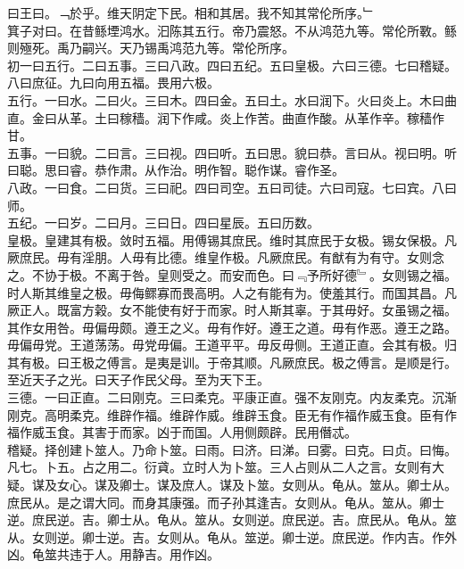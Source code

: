 \documentclass{zhvt-classic}
\begin{document}
\hspace*{2em}曰王曰。﹁於乎。维天阴定下民。相和其居。我不知其常伦所序。﹂\\
\hspace*{2em}箕子对曰。在昔鲧堙鸿水。汩陈其五行。帝乃震怒。不从鸿范九等。常伦所斁。鲧则殛死。禹乃嗣兴。天乃锡禹鸿范九等。常伦所序。\\
\hspace*{2em}初一曰五行。二曰五事。三曰八政。四曰五纪。五曰皇极。六曰三德。七曰稽疑。八曰庶征。九曰向用五福。畏用六极。\\
\hspace*{2em}五行。一曰水。二曰火。三曰木。四曰金。五曰土。水曰润下。火曰炎上。木曰曲直。金曰从革。土曰稼穑。润下作咸。炎上作苦。曲直作酸。从革作辛。稼穑作甘。\\
\hspace*{2em}五事。一曰貌。二曰言。三曰视。四曰听。五曰思。貌曰恭。言曰从。视曰明。听曰聪。思曰睿。恭作肃。从作治。明作智。聪作谋。睿作圣。\\
\hspace*{2em}八政。一曰食。二曰货。三曰祀。四曰司空。五曰司徒。六曰司寇。七曰宾。八曰师。\\
\hspace*{2em}五纪。一曰岁。二曰月。三曰日。四曰星辰。五曰历数。\\
\hspace*{2em}皇极。皇建其有极。敛时五福。用傅锡其庶民。维时其庶民于女极。锡女保极。凡厥庶民。毋有淫朋。人毋有比德。维皇作极。凡厥庶民。有猷有为有守。女则念之。不协于极。不离于咎。皇则受之。而安而色。曰﹃予所好德﹄。女则锡之福。时人斯其维皇之极。毋侮鳏寡而畏高明。人之有能有为。使羞其行。而国其昌。凡厥正人。既富方榖。女不能使有好于而家。时人斯其辜。于其毋好。女虽锡之福。其作女用咎。毋偏毋颇。遵王之义。毋有作好。遵王之道。毋有作恶。遵王之路。毋偏毋党。王道荡荡。毋党毋偏。王道平平。毋反毋侧。王道正直。会其有极。归其有极。曰王极之傅言。是夷是训。于帝其顺。凡厥庶民。极之傅言。是顺是行。至近天子之光。曰天子作民父母。至为天下王。\\
\hspace*{2em}三德。一曰正直。二曰刚克。三曰柔克。平康正直。强不友刚克。内友柔克。沉渐刚克。高明柔克。维辟作福。维辟作威。维辟玉食。臣无有作福作威玉食。臣有作福作威玉食。其害于而家。凶于而国。人用侧颇辟。民用僭忒。\\
\hspace*{2em}稽疑。择创建卜筮人。乃命卜筮。曰雨。曰济。曰涕。曰雾。曰克。曰贞。曰悔。凡七。卜五。占之用二。衍貣。立时人为卜筮。三人占则从二人之言。女则有大疑。谋及女心。谋及卿士。谋及庶人。谋及卜筮。女则从。龟从。筮从。卿士从。庶民从。是之谓大同。而身其康强。而子孙其逢吉。女则从。龟从。筮从。卿士逆。庶民逆。吉。卿士从。龟从。筮从。女则逆。庶民逆。吉。庶民从。龟从。筮从。女则逆。卿士逆。吉。女则从。龟从。筮逆。卿士逆。庶民逆。作内吉。作外凶。龟筮共违于人。用静吉。用作凶。\\
\end{document}
